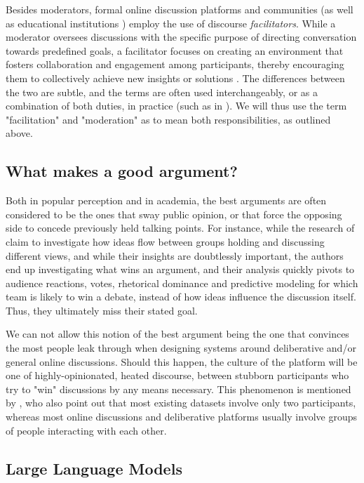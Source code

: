 Besides moderators, formal online discussion platforms and communities (as well as educational institutions \cite{Wang2008StudentfacilitatorsRI, Zhong2019ExploringTR}) employ the use of discourse \textit{facilitators}. While a moderator oversees discussions with the specific purpose of directing conversation towards predefined goals, a facilitator focuses on creating an environment that fosters collaboration and engagement among participants, thereby encouraging them to collectively achieve new insights or solutions \cite{wef_moderation}. The differences between the two are subtle, and the terms are often used interchangeably, or as a combination of both duties, in practice (such as in \citet{Zhong2019ExploringTR, Carson2008}). We will thus use the term "facilitation" and "moderation" as to mean both responsibilities, as outlined above. 

\subsection{What makes a good argument?}
\label{sec:background:good-argument}

Both in popular perception and in academia, the best arguments are often considered to be the ones that sway public opinion, or that force the opposing side to concede previously held talking points. For instance, while the research of \citet{zhang2016-oxford} claim to investigate how ideas flow between groups holding and discussing different views, and while their insights are doubtlessly important, the authors end up investigating what wins an argument, and their analysis quickly pivots to audience reactions, votes, rhetorical dominance and predictive modeling for which team is likely to win a debate, instead of how ideas influence the discussion itself. Thus, they ultimately miss their stated goal.

We can not allow this notion of the best argument being the one that convinces the most people leak through when designing systems around deliberative and/or general online discussions. Should this happen, the culture of the platform will be one of highly-opinionated, heated discourse, between stubborn participants who try to "win" discussions by any means necessary. This phenomenon is mentioned by \citet{karadzhov2023delidata}, who also point out that most existing datasets involve only two participants, whereas most online discussions and deliberative platforms usually involve groups of people interacting with each other. 


\subsection{Large Language Models}
\label{sec:background:llm}

